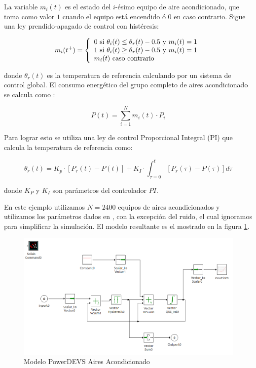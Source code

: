 \documentclass[a4paper,	11pt]{report}
\begin{document}
La variable $m_i (t)$ es el estado del $i$-ésimo equipo de aire acondicionado, que toma como valor $1$ cuando el equipo está encendido ó $0$ en caso contrario. Sigue una ley prendido-apagado de control con histéresis:

\begin{equation}
m_i(t^{+}) = \left\{ 
  \begin{array}{l l}
    0 \text{ si } \theta_i(t) \leq \theta_r(t) - 0.5 \text{ y } m_i(t)=1 \\
    1 \text{ si } \theta_i(t) \geq \theta_r(t) - 0.5 \text{ y } m_i(t)=1 \\
    m_i (t) \text{ caso contrario } 
  \end{array} \right.
\end{equation}

donde $\theta_r(t)$ es la temperatura de referencia calculando por un sistema de control global.
El consumo energético del grupo completo de aires acondicionado se calcula como :

\begin{equation*}
P(t) = \sum_{i=1}^{N}  m_i(t) \cdot P_i
\end{equation*}

Para lograr esto se utiliza una ley de control Proporcional Integral (PI) que calcula la temperatura de referencia como:

\begin{equation*}
\theta_r(t) = K_p \cdot [P_r(t) - P(t)] + K_I \cdot \int_{\tau = 0}^t [P_r(\tau) - P(\tau)] d\tau
\end{equation*}

donde $K_P$ y $K_I$ son parámetros del controlador $PI$.

En este ejemplo utilizamos $N = 2400$ equipos de aires acondicionados y utilizamos los parámetros dados en \cite{PKBW12}, con la excepción del ruido, el cual ignoramos para simplificar la simulación. El modelo resultante es el mostrado en la figura \ref{fig:airs}.

\begin{figure}[!htbp]
  \includegraphics[scale=0.40]{Airs}
  \caption{Modelo PowerDEVS Aires Acondicionado }
   \label{fig:airs}
\end{figure}
\end{document}
